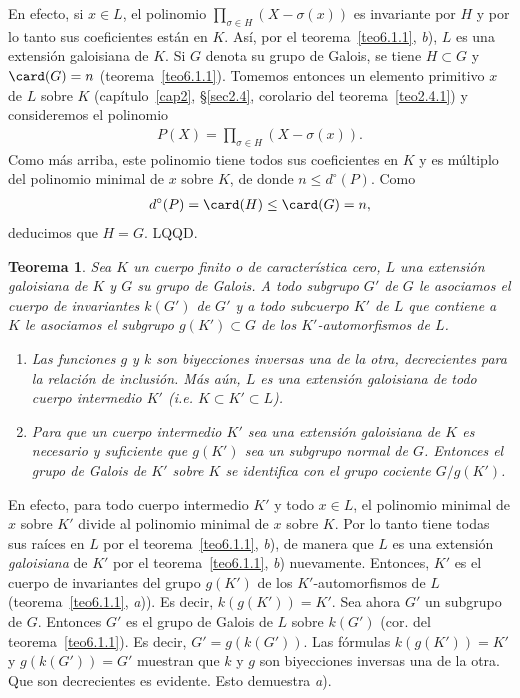 \documentclass[bibtotoc,leqno,spanish]{amsbook}
\newcommand{\QED}{LQQD.}
\numberwithin{equation}{section}
\theoremstyle{note}
\theoremstyle{note}
\newtheorem{theorem}{Teorema}
\theoremstyle{rem}
\numberwithin{theorem}{section}
\numberwithin{proposition}{section}
\numberwithin{definition}{section}
\numberwithin{lemma}{section}
\numberwithin{corollary}{section}
\numberwithin{example}{section}
\numberwithin{footnote}{section}%
\begin{document}
En efecto, si $x\in L$, el polinomio $\prod_{\sigma\in H}(X-\sigma(x))$ es invariante
por $H$ y por
lo tanto sus coeficientes est\'an en $K$. As\'i, por el
teorema~\ref{teo6.1.1}, {\itshape b}), $L$ es una extensi\'on
galoisiana de $K$. Si $G$ denota su grupo de Galois, se tiene $H\subset G$ y $\card(G) = n$
(teorema~\ref{teo6.1.1}). Tomemos entonces un elemento primitivo $x$ de $L$ sobre $K$
(cap\'itulo~\ref{cap2},
\S\ref{sec2.4}, corolario del teorema~\ref{teo2.4.1}) y consideremos el polinomio
\begin{gather*}
P(X) = \prod_{\sigma\in H}(X-\sigma(x)).
\end{gather*}
Como m\'as arriba, este polinomio tiene todos sus coeficientes en $K$ y es m\'ultiplo
del polinomio minimal
de $x$ sobre $K$, de donde $n\leq d^{\circ}(P)$. Como
\begin{gather*}
d^{\circ}(P) = \card(H)\leq\card(G) = n,
\end{gather*}
deducimos que $H = G$. \QED

\begin{theorem}\label{teo6.1.2}
Sea $K$ un cuerpo finito o de caracter\'istica cero, $L$ una extensi\'on galoisiana de $K$
y $G$ su grupo
de Galois. A todo subgrupo $G'$ de $G$ le asociamos  el cuerpo de invariantes $k(G')$
de $G'$ y a todo
subcuerpo $K'$ de $L$ que contiene a $K$ le asociamos el subgrupo $g(K')\subset G$ de
los $K'$-automorfismos
de $L$.
\begin{enumerate}%
\item[a)] Las funciones $g$ y $k$ son biyecciones inversas una de la otra, decrecientes
para la relaci\'on de
inclusi\'on. M\'as a\'un, $L$ es una extensi\'on galoisiana de todo cuerpo intermedio $K'$
(i.e. $K\subset K'\subset L$).
\item[b)] Para que un cuerpo intermedio $K'$ sea una extensi\'on galoisiana de $K$ es
necesario y suficiente que
$g(K')$ sea un subgrupo normal de $G$. Entonces el grupo de Galois de $K'$ sobre $K$
se identifica con el
grupo cociente $G/g(K')$.
\end{enumerate}%
\end{theorem}

En efecto, para todo cuerpo intermedio $K'$ y todo $x\in L$, el polinomio minimal de $x$
sobre $K'$ divide
al polinomio minimal de $x$ sobre $K$. Por lo tanto tiene todas sus ra\'ices en $L$ por
el teorema~\ref{teo6.1.1}, {\itshape b}),
de manera que $L$ es una extensi\'on {\em galoisiana} de $K'$ por el teorema~\ref{teo6.1.1},
{\itshape b}) nuevamente.
Entonces, $K'$ es el cuerpo de invariantes del grupo $g(K')$ de los $K'$-automorfismos de $L$
(teorema~\ref{teo6.1.1}, {\itshape a})). Es decir, $k(g(K')) = K'$. Sea ahora $G'$
un subgrupo de $G$. Entonces
$G'$ es el grupo de Galois de $L$ sobre $k(G')$ (cor. del teorema~\ref{teo6.1.1}).
Es decir, $G' = g(k(G'))$.
Las f\'ormulas $k(g(K')) = K'$ y $g(k(G')) = G'$ muestran que $k$ y $g$ son biyecciones
inversas una de la otra.
Que son decrecientes es evidente. Esto demuestra {\itshape a}).
\end{document}
